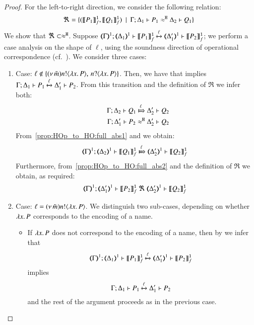 \begin{proof}
	\noi For the left-to-right direction, we consider the following relation:
%
	\[
		\Re = \{
		(\llbracket P_1\rrbracket^\mathtt{1}_f, \llbracket Q_1\rrbracket^\mathtt{1}_f)
		\ \ |\ \  \Gamma; \Delta_1 \vdash P_1 \approx^\mathtt{H} \Delta_2 \vdash Q_1\}
	\]
%
	We show that $\Re \subset \approx^\mathtt{H}$.
	Suppose $\horel{\mapt{\Gamma}^{1}}{\mapt{\Delta_1}^{1}}{\pmapp{P_1}{1}{f}}{\hby{\ell}}{\mapt{\Delta_1'}^{1}}{\pmapp{P_2}{1}{f}}$; 
we perform a case analysis on the shape of ${\ell}$, using 
the soundness direction of operational correspondence (cf.~).
			We consider three cases:
	\begin{enumerate}[1.]

	\item Case: $\ell \notin \{(\nu\, \tilde{m}) n ! \langle \lambda x.\,P \rangle,\, n ? \langle \lambda x.\,P \rangle\}$.
	Then, we have that 
	 implies
		$\Gamma; \Delta_1 \vdash P_1 \xmapsto{\ell} \Delta_1' \vdash P_2$. 
From this transition and the definition of $\Re$ we infer both:
%
	\begin{eqnarray}
		&&\horel{\Gamma}{\Delta_2}{Q_1}{\Hby{\ell}}{\Delta_2'}{Q_2}
		\label{prop:HOp_to_HO:full_abs1}
		\\
		&&\horel{\Gamma}{\Delta_1'}{P_2}{\hwb}{\Delta_2'}{Q_2}
		\label{prop:HOp_to_HO:full_abs2}
	\end{eqnarray}
%
	\noi From~\eqref{prop:HOp_to_HO:full_abs1} and  we obtain:
%
	\[
		\horel{\mapt{\Gamma}^{1}}{\mapt{\Delta_2}^{1}}{\pmapp{Q_1}{1}{f}}{\Hby{\ell}}{\mapt{\Delta_2'}^{1}}{\pmapp{Q_2}{1}{f}}
	\]
%
	\noi Furthermore, from~\eqref{prop:HOp_to_HO:full_abs2} and the definition of $\Re$ we obtain, as required:
%
	\[
		\horel{\mapt{\Gamma}^{1}}{\mapt{\Delta_1'}^{1}}{\pmapp{P_2}{1}{f}}{\ \Re\ }{\mapt{\Delta_2'}^{1}}{\pmapp{Q_2}{1}{f}}
	\]
	\item Case: $\ell = (\nu\, \tilde{m}) n ! \langle \lambda x.\,P \rangle$.
    We distinguish two sub-cases, depending on whether $\lambda x.\,P$ corresponds to the encoding of a name. 
    \begin{itemize}
    \item If $\lambda x.\,P$  does not correspond to the encoding of a name, then 
	by  we infer that
%
	\[
		\horel{\mapt{\Gamma}^{1}}{\mapt{\Delta_1}^{1}}{\pmapp{P_1}{1}{f}}{\hby{\ell}}{\mapt{\Delta_1'}^{1}}{\pmapp{P_2}{1}{f}}
	\]
%
	\noi implies
%
	\[
		\Gamma; \Delta_1 \vdash P_1 \xmapsto{\ell} \Delta_1' \vdash P_2
	\]
%
	and the rest of the argument proceeds as in the previous case.


\end{itemize}
\end{enumerate}
\end{proof}
